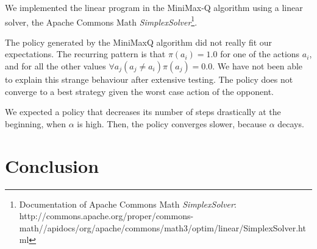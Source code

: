 \documentclass{article}
\begin{document}
We implemented the linear program in the MiniMax-Q algorithm using a linear solver, the Apache Commons Math \emph{SimplexSolver}\footnote{Documentation of Apache Commons Math \emph{SimplexSolver}: http://commons.apache.org/proper/commons-math//apidocs/org/apache/commons/math3/optim/linear/SimplexSolver.html}.

The policy generated by the MiniMaxQ algorithm did not really fit our expectations. The recurring pattern is that $\pi(a_i) = 1.0$ for one of the actions $a_i$, and for all the other values $\forall a_j (a_j \neq a_i) \pi(a_j) = 0.0$. We have not been able to explain this strange behaviour after extensive testing. The policy does not converge to a best strategy given the worst case action of the opponent.

We expected a policy that decreases its number of steps drastically at the beginning, when $\alpha$ is high. Then, the policy converges slower, because $\alpha$ decays.
\section{Conclusion}
\end{document}
